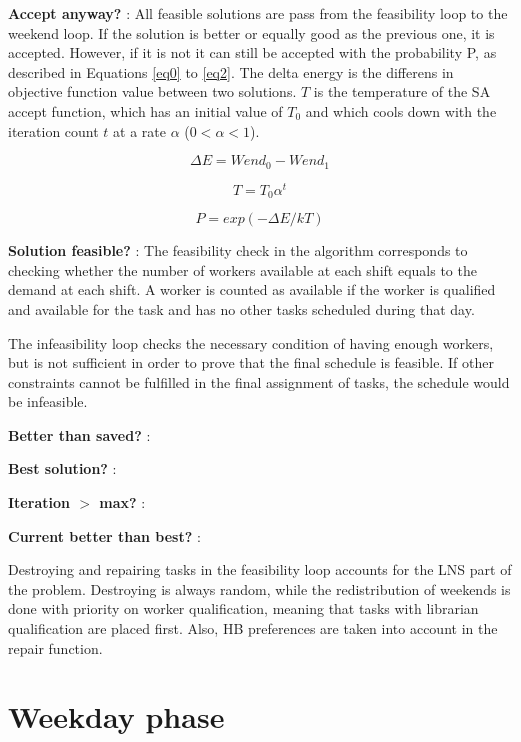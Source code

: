 \textbf{Accept anyway?} : All feasible solutions are pass from the feasibility loop to the weekend loop. If the solution is better or equally good as the previous one, it is accepted. However, if it is not it can still be accepted with the probability P, as described in Equations \ref{eq0} to \ref{eq2}. The delta energy is the differens in objective function value between two solutions. $T$ is the temperature of the SA accept function, which has an initial value of $T_0$ and which cools down with the iteration count  $t$ at a rate $\alpha$ ($0 < \alpha < 1$).

\begin{equation}
\Delta E = Wend_0 - Wend_1
\label{eq1}
\end{equation}

\begin{equation}
T = T_0 \alpha^t
\label{eq2}
\end{equation}

\begin{equation}
P = exp(-\Delta E /kT)
\label{eq0}
\end{equation}

\textbf{Solution feasible?} : The feasibility check in the algorithm corresponds to checking whether the number of workers available at each shift equals to the demand at each shift. A worker is counted as available if the worker is qualified and available for the task and has no other tasks scheduled during that day.

The infeasibility loop checks the necessary condition of having enough workers, but is not sufficient in order to prove that the final schedule is feasible. If other constraints cannot be fulfilled in the final assignment of tasks, the schedule would be infeasible.

\textbf{Better than saved?} :

\textbf{Best solution?} :

\textbf{Iteration $>$ max?} :

\textbf{Current better than best?} :

Destroying and repairing tasks in the  feasibility loop accounts for the LNS part of the problem. Destroying is always random, while the redistribution of weekends is done with priority on worker qualification, meaning that tasks with librarian qualification are placed first. Also, HB preferences are taken into account in the repair function.

\section{Weekday phase}

